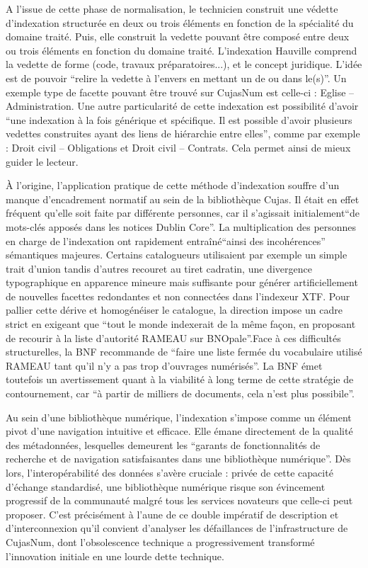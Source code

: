 A l'issue de cette phase de normalisation, le technicien construit une védette d'indexation structurée en deux ou trois éléments en fonction de la spécialité du domaine traité. Puis, elle construit la vedette pouvant être composé entre deux ou trois éléments en fonction du domaine traité. L'indexation Hauville comprend la vedette de forme (code, travaux préparatoires...), et le concept juridique. L'idée est de pouvoir \enquote{relire la vedette à l'envers en mettant un de ou dans le(s)}. Un exemple type de facette pouvant être trouvé sur CujasNum est celle-ci : Eglise -- Administration. Une autre particularité de cette indexation est possibilité d'avoir \enquote{une indexation à la fois générique et spécifique. Il est possible d'avoir plusieurs vedettes construites ayant des liens de hiérarchie entre elles}, comme par exemple : Droit civil -- Obligations et Droit civil -- Contrats. Cela permet ainsi de mieux guider le lecteur.

À l'origine, l'application pratique de cette méthode d'indexation souffre d'un manque d'encadrement normatif au sein de la bibliothèque Cujas. Il était en effet fréquent qu'elle soit faite par différente personnes, car il s'agissait initialement\enquote{de mots-clés apposés dans les notices Dublin Core}. La multiplication des personnes en charge de l'indexation ont rapidement entraîné\enquote{ainsi des incohérences} sémantiques majeures. Certains catalogueurs utilisaient par exemple un simple trait d'union tandis d'autres recouret au tiret cadratin, une divergence typographique en apparence mineure mais suffisante pour générer artificiellement de nouvelles facettes redondantes et non connectées dans l'indexeur XTF. Pour pallier cette dérive et homogénéiser le catalogue, la direction impose un cadre strict en exigeant que \enquote{tout le monde indexerait de la même façon, en proposant de recourir à la liste d'autorité RAMEAU sur BNOpale}.Face à ces difficultés structurelles, la BNF recommande de \enquote{faire une liste fermée du vocabulaire utilisé RAMEAU tant qu'il n'y a pas trop d'ouvrages numérisés}. La BNF émet toutefois un avertissement quant à la viabilité à long terme de cette stratégie de contournement, car \enquote{à partir de milliers de documents, cela n'est plus possibile}. 

Au sein d'une bibliothèque numérique, l'indexation s'impose comme un élément pivot d'une navigation intuitive et efficace. Elle émane directement de la qualité des métadonnées, lesquelles demeurent les \enquote{garants de fonctionnalités de recherche et de navigation satisfaisantes dans une bibliothèque numérique}. Dès lors, l'interopérabilité des données s'avère cruciale : privée de cette capacité d'échange standardisé, une bibliothèque numérique risque son évincement progressif de la communauté malgré tous les services novateurs que celle-ci peut proposer. C'est précisément à l'aune de ce double impératif de description et d'interconnexion qu'il convient d'analyser les défaillances de l'infrastructure de CujasNum, dont l'obsolescence technique a progressivement transformé l'innovation initiale en une lourde dette technique.